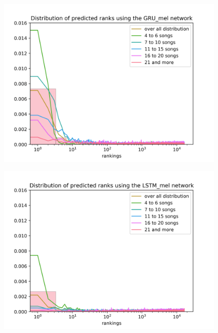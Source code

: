 \begin{figure}[h!]
\centering
\begin{minipage}{.5\textwidth}
  \centering
  \includegraphics[width=1\linewidth]{./img/gru_mel_graph.png}
  \label{fig:gru_mel_distribution}
\end{minipage}%
\begin{minipage}{.5\textwidth}
  \centering
  \includegraphics[width=1\linewidth]{./img/lstm_mel_graph.png}
  \label{fig:gru_mel_distribution}
\end{minipage}
\end{figure}\label{fig:mel_nn_distributions}


